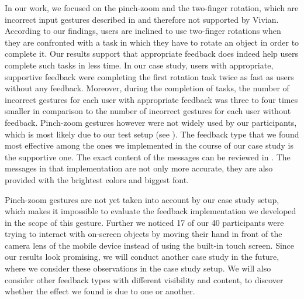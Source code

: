 \documentclass[11pt, a4paper]{article}
\begin{document}
		In our work, we focused on the pinch-zoom and the two-finger rotation, which are incorrect input gestures described in  and therefore not supported by Vivian. According to our findings, users are inclined to use two-finger rotations when they are confronted with a task in which they have to rotate an object in order to complete it. Our results support that appropriate feedback does indeed help users complete such tasks in less time. In our case study, users with appropriate, supportive feedback were completing the first rotation task twice as fast as users without any feedback. Moreover, during the completion of tasks, the number of incorrect gestures for each user with appropriate feedback was three to four times smaller in comparison to the number of incorrect gestures for each user without feedback. Pinch-zoom gestures however were not widely used by our participants, which is most likely due to our test setup (see ). The feedback type that we found most effective among the ones we implemented in the course of our case study is the supportive one. The exact content of the messages can be reviewed in . The messages in that implementation are not only more accurate, they are also provided with the brightest colors and biggest font.

		Pinch-zoom gestures are not yet taken into account by our case study setup, which makes it impossible to evaluate the feedback implementation we developed in the scope of this gesture. Further we noticed 17 of our 40 participants were trying to interact with on-screen objects by moving their hand in front of the camera lens of the mobile device instead of using the built-in touch screen. Since our results look promising, we will conduct another case study in the future, where we consider these observations in the case study setup. We will also consider other feedback types with different visibility and content, to discover whether the effect we found is due to one or another.

	\pagebreak
	\printbibliography
\restoregeometry
\end{document}
